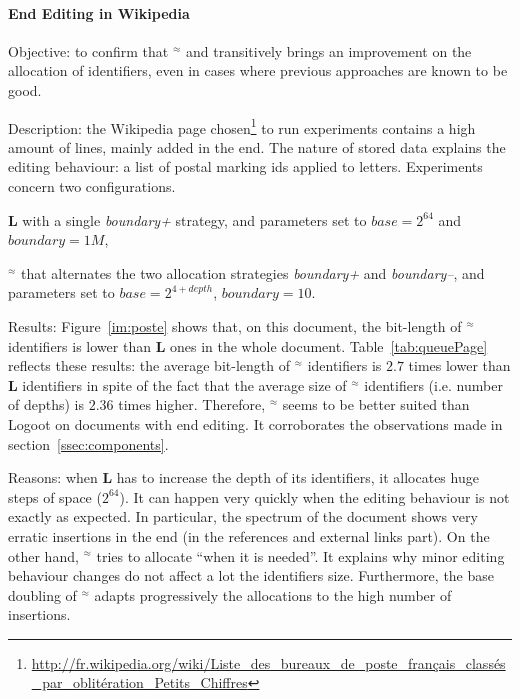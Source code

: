 \paragraph{End Editing in Wikipedia}
\begin{asparadesc}
  
 \item[Objective:] to confirm that \textbf{\NAME{}}$^\approx$ and transitively
   \NAME{} brings an improvement on the allocation of identifiers, even in
   cases where previous approaches are known to be good.

  \item[Description:] the Wikipedia page
    chosen\footnote{\url{http://fr.wikipedia.org/wiki/Liste_des_bureaux_de_poste_français_classés_par_oblitération_Petits_Chiffres}}
    to run experiments contains a high amount of lines, mainly added in the
    end. The nature of stored data explains the editing behaviour: a list of
    postal marking ids applied to letters. Experiments concern two
    configurations.
  \begin{inparaenum}[(1)]
    \item \textbf{L} with a single \emph{boundary+} strategy, and parameters
      set to $base=2^{64}$ and $boundary=1M$,
    \item \textbf{\NAME{}}$^\approx$ that alternates the two allocation
      strategies \emph{boundary+} and \emph{boundary--}, and parameters set to
      $base=2^{4+depth}$, $boundary=10$.
  \end{inparaenum}

  \item[Results:] Figure~\ref{im:poste} shows that, on this document, the
    bit-length of \textbf{\NAME{}}$^\approx$ identifiers is lower than
    \textbf{L} ones in the whole document. Table~\ref{tab:queuePage} reflects
    these results: the average bit-length of \textbf{\NAME{}}$^\approx$
    identifiers is $2.7$ times lower than \textbf{L} identifiers in spite of
    the fact that the average size of \textbf{\NAME{}}$^\approx$ identifiers
    (i.e. number of depths) is $2.36$ times higher. Therefore,
    \textbf{\NAME{}}$^\approx$ seems to be better suited than Logoot on
    documents with end editing. It corroborates the observations made in
    section~\ref{ssec:components}.

  \item[Reasons:] when \textbf{L} has to increase the depth of its identifiers,
    it allocates huge steps of space ($2^{64}$). It can happen very quickly
    when the editing behaviour is not exactly as expected. In particular, the
    spectrum of the document shows very erratic insertions in the end (in the
    references and external links part). On the other hand,
    \textbf{\NAME{}}$^\approx$ tries to allocate ``when it is needed''. It
    explains why minor editing behaviour changes do not affect a lot the
    identifiers size. Furthermore, the base doubling of
    \textbf{\NAME{}}$^\approx$ adapts progressively the allocations to the high
    number of insertions.
\end{asparadesc}
 

